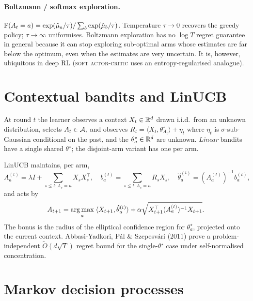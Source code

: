 \documentclass[11pt,oneside]{scrbook}
\begin{document}
\paragraph{Boltzmann / softmax exploration.}
$\mathbb{P}(A_t=a) = \exp(\hat\mu_a/\tau) / \sum_b \exp(\hat\mu_b/\tau)$. Temperature
$\tau\to 0$ recovers the greedy policy; $\tau\to\infty$ uniformises. Boltzmann
exploration has no $\log T$ regret guarantee in general because it can stop
exploring sub-optimal arms whose estimates are far below the optimum, even when
the estimates are very uncertain. It is, however, ubiquitous in deep RL
(\textsc{soft actor-critic} uses an entropy-regularised analogue).

\section{Contextual bandits and LinUCB}

\begin{definition}
At round $t$ the learner observes a context $X_t\in\mathbb{R}^d$ drawn i.i.d.\ from
an unknown distribution, selects $A_t\in\mathcal{A}$, and observes
$R_t = \langle X_t, \theta^\star_{A_t}\rangle + \eta_t$ where
$\eta_t$ is $\sigma$-sub-Gaussian conditional on the past, and the
$\theta^\star_a\in\mathbb{R}^d$ are unknown. \emph{Linear} bandits have a single
shared $\theta^\star$; the disjoint-arm variant has one per arm.
\end{definition}

LinUCB maintains, per arm,
\[
A_a^{(t)} = \lambda I + \sum_{s\le t : A_s = a} X_s X_s^\top,
\quad
b_a^{(t)} = \sum_{s\le t : A_s = a} R_s X_s,
\quad
\hat\theta_a^{(t)} = (A_a^{(t)})^{-1} b_a^{(t)},
\]
and acts by
\begin{equation}
A_{t+1} = \operatorname*{arg\,max}_a \;\langle X_{t+1}, \hat\theta_a^{(t)}\rangle
         + \alpha\sqrt{X_{t+1}^\top (A_a^{(t)})^{-1} X_{t+1}}.
\label{eq:linucb}
\end{equation}
The bonus is the radius of the elliptical confidence region for $\theta^\star_a$,
projected onto the current context. Abbasi-Yadkori, Pál \& Szepesvári (2011)
prove a problem-independent $\tilde O(d\sqrt{T})$ regret bound for the
single-$\theta^\star$ case under self-normalised concentration.

\section{Markov decision processes}
\end{document}
